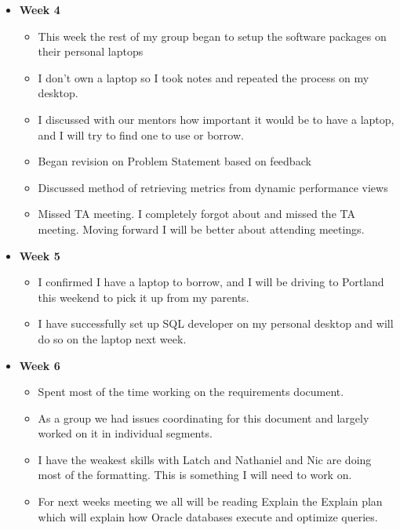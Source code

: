 \documentclass[xcolor=dvipsnames]{beamer}
\begin{document}
\begin{frame}
\begin{itemize}
	\item \textbf{Week 4}
    \begin{itemize}    	
        \item This week the rest of my group began to setup the software packages on their personal laptops
        \item I don't own a laptop so I took notes and repeated the process on my desktop.
         \item I discussed with our mentors how important it would be to have a laptop, and I will try to find one to use or borrow.
        
        \item Began revision on Problem Statement based on feedback
        \item Discussed method of retrieving metrics from dynamic performance views
        \item Missed TA meeting. I completely forgot about and missed the TA meeting. Moving forward I will be better about  attending meetings. 
	\end{itemize}
\end{itemize}
\end{frame}

\begin{frame}
\begin{itemize}
	\item \textbf{Week 5}
    \begin{itemize}
    	\item I confirmed I have a laptop to borrow, and I will be driving to Portland this weekend to pick it up from my parents.
        \item I have successfully set up SQL developer on my personal desktop and will do so on the laptop next week.
    \end{itemize}
   	\end{itemize}
\end{frame}

\begin{frame}
\begin{itemize}
	\item \textbf{Week 6}
    \begin{itemize}
    	\item Spent most of the time working on the requirements document.
        \item As a group we had issues coordinating for this document and largely worked on it in individual segments.
        \item I have the weakest skills with Latch and Nathaniel and Nic are doing most of the formatting. This is something I will need to work on.
        \item For next weeks meeting we all will be reading Explain the Explain plan which will explain how Oracle databases execute and optimize queries. 
	\end{itemize}
\end{itemize}
\end{frame}
\end{document}
